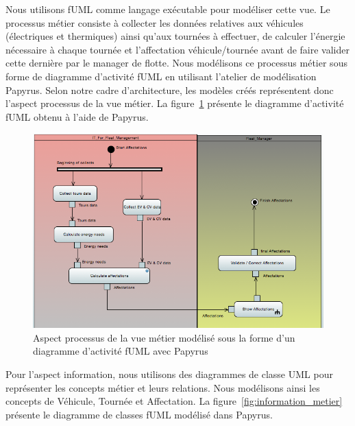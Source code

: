 Nous utilisons fUML comme langage
exécutable pour modéliser cette vue. Le processus métier consiste à collecter
les données relatives aux véhicules (électriques et thermiques) ainsi qu'aux
tournées à effectuer, de calculer l'énergie nécessaire à chaque tournée et
l'affectation véhicule/tournée avant de faire valider cette dernière par le
manager de flotte. Nous modélisons ce processus métier sous forme de diagramme
d'activité fUML en utilisant l'atelier de modélisation Papyrus. Selon notre cadre
d'architecture, les modèles créés représentent donc l'aspect processus de la vue
métier. La figure~\ref{fig:processus_fuml} présente le diagramme d'activité fUML obtenu à
l'aide de Papyrus.

\begin{figure}[!htbp]
 \begin{center}
  \includegraphics[width=1\textwidth]{figures/5_implementation/processus_fuml.png}
 \end{center}
 \caption{Aspect processus de la vue métier modélisé sous la forme d'un diagramme d'activité fUML avec Papyrus}
 \label{fig:processus_fuml}
\end{figure}


Pour l'aspect information, nous utilisons des diagrammes de classe UML pour
représenter les concepts métier et leurs relations. Nous modélisons ainsi les
concepts de Véhicule, Tournée et Affectation. La figure~\ref{fig:information_metier}
présente le diagramme de classes fUML modélisé dans Papyrus.

